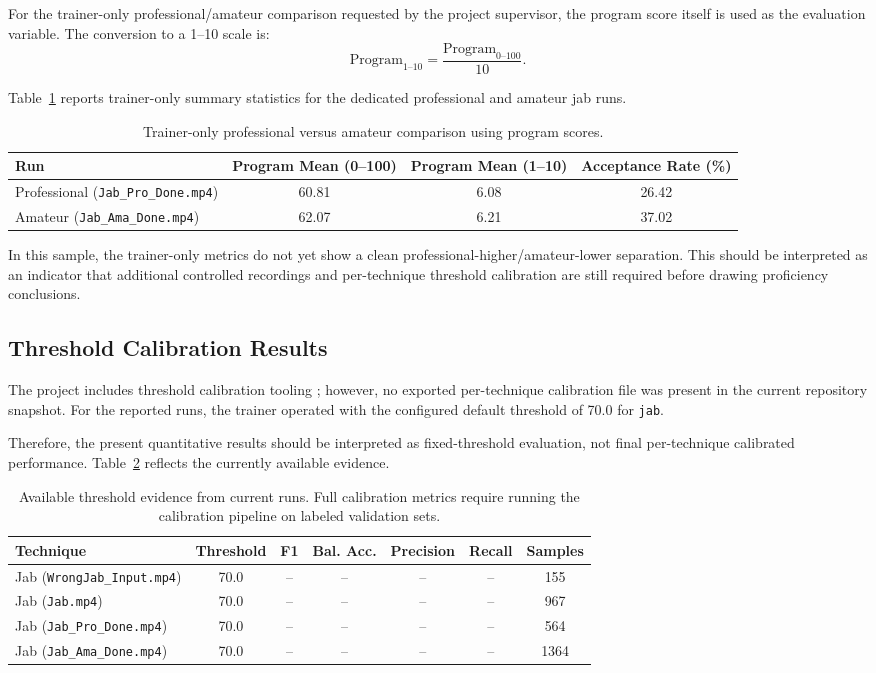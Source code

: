\documentclass[12pt]{article}
\begin{document}
For the trainer-only professional/amateur comparison requested by the project supervisor, the program score itself is used as the evaluation variable. The conversion to a 1--10 scale is:
\[
\text{Program}_{1\text{--}10} = \frac{\text{Program}_{0\text{--}100}}{10}.
\]

Table~\ref{tab:trainer_only_pro_ama} reports trainer-only summary statistics for the dedicated professional and amateur jab runs.

\begin{table}[H]
\centering
\begin{tabular}{lccc}
\toprule
Run & Program Mean (0--100) & Program Mean (1--10) & Acceptance Rate (\%) \\
\midrule
Professional (\texttt{Jab\_Pro\_Done.mp4}) & 60.81 & 6.08 & 26.42 \\
Amateur (\texttt{Jab\_Ama\_Done.mp4}) & 62.07 & 6.21 & 37.02 \\
\bottomrule
\end{tabular}
\caption{Trainer-only professional versus amateur comparison using program scores.}
\label{tab:trainer_only_pro_ama}
\end{table}

In this sample, the trainer-only metrics do not yet show a clean professional-higher/amateur-lower separation. This should be interpreted as an indicator that additional controlled recordings and per-technique threshold calibration are still required before drawing proficiency conclusions.

\subsection{Threshold Calibration Results}
The project includes threshold calibration tooling \cite{projectCalibrate}; however, no exported per-technique calibration file was present in the current repository snapshot. For the reported runs, the trainer operated with the configured default threshold of 70.0 for \texttt{jab}.

Therefore, the present quantitative results should be interpreted as fixed-threshold evaluation, not final per-technique calibrated performance. Table~\ref{tab:threshold_template} reflects the currently available evidence.

\begin{table}[H]
\centering
\begin{tabular}{lcccccc}
\toprule
Technique & Threshold & F1 & Bal. Acc. & Precision & Recall & Samples \\
\midrule
Jab (\texttt{WrongJab\_Input.mp4}) & 70.0 & -- & -- & -- & -- & 155 \\
Jab (\texttt{Jab.mp4}) & 70.0 & -- & -- & -- & -- & 967 \\
Jab (\texttt{Jab\_Pro\_Done.mp4}) & 70.0 & -- & -- & -- & -- & 564 \\
Jab (\texttt{Jab\_Ama\_Done.mp4}) & 70.0 & -- & -- & -- & -- & 1364 \\
\bottomrule
\end{tabular}
\caption{Available threshold evidence from current runs. Full calibration metrics require running the calibration pipeline on labeled validation sets.}
\label{tab:threshold_template}
\end{table}
\end{document}
